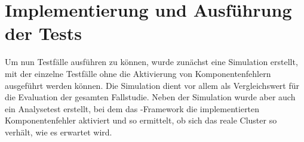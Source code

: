 \chapter{Implementierung und Ausführung der Tests}
\label{chap:testExecution}

Um nun Testfälle ausführen zu können, wurde zunächst eine Simulation erstellt, mit der einzelne Testfälle ohne die Aktivierung von Komponentenfehlern ausgeführt werden können.
Die Simulation dient vor allem als Vergleichswert für die Evaluation der gesamten Fallstudie.
Neben der Simulation wurde aber auch ein Analysetest erstellt, bei dem das \sS-Framework die implementierten Komponentenfehler aktiviert und so ermittelt, ob sich das reale Cluster so verhält, wie es erwartet wird.








